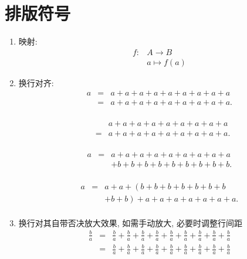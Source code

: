 \documentclass[a4paper, 11pt, UTF8]{article}
\theoremstyle{plain}
\theoremstyle{definition}
\theoremstyle{remark}
\begin{document}
	\section{排版符号}
	
	\begin{enumerate}
		\item 映射:
		\[ \begin{array}{*{20}{c}}
			f: & A \rightarrow B \\
			& a \mapsto f(a)
		\end{array} \]
	
		\item  换行对齐:
		\begin{displaymath}
			\begin{array}{lll}
				a&=&a+a+a+a+a+a+a+a+a\\
				&=&a+a+a+a+a+a+a+a+a.\\
			\end{array}	
		\end{displaymath}
		
		\begin{displaymath}
			\begin{array}{lll}
				&&a+a+a+a+a+a+a+a+a\\
				&=&a+a+a+a+a+a+a+a+a.\\
			\end{array}	
		\end{displaymath}
	
		\begin{displaymath}
			\begin{array}{lll}
				a&=&a+a+a+a+a+a+a+a+a\\
				&&+b+b+b+b+b+b+b+b+b.\\
			\end{array}	
		\end{displaymath}
	
		\begin{displaymath}
			\begin{array}{lll}
				a&=&a+a+\left(b+b+b+b+b+b+b\right. \\
				&&+\left.b+b\right)+a+a+a+a+a+a+a.\\
			\end{array}	
		\end{displaymath}
	
		\item 换行对其自带否决放大效果, 如需手动放大, 必要时调整行间距
		\renewcommand*{\arraystretch}{1.5}
		\begin{displaymath}
			\begin{array}{lll}
				\displaystyle\frac{b}{a}&=&\displaystyle\frac{b}{a}+\frac{b}{a}+\frac{b}{a}+\frac{b}{a}+\frac{b}{a}+\frac{b}{a}+\frac{b}{a}+\frac{b}{a}+\frac{b}{a}\\
				&=&\displaystyle\frac{b}{a}+\frac{b}{a}+\frac{b}{a}+\frac{b}{a}+\frac{b}{a}+\frac{b}{a}+\frac{b}{a}+\frac{b}{a}+\frac{b}{a}\\
			\end{array}
		\end{displaymath}
		\renewcommand*{\arraystretch}{1}
		

\end{enumerate}
\end{document}

